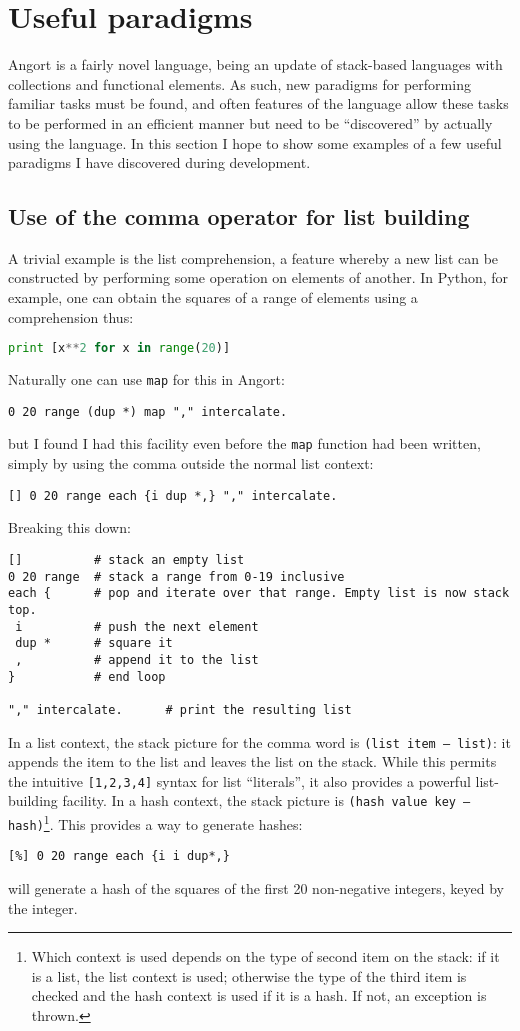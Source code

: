 \section{Useful paradigms}
Angort is a fairly novel language, being an update of stack-based
languages with collections and functional elements. As such, new
paradigms for performing familiar tasks must be found, and often
features of the language allow these tasks to be performed in
an efficient manner but need to be ``discovered''
by actually using the language. In this section I hope to show some
examples of a few useful paradigms I have discovered during development.


\subsection{Use of the comma operator for list building}
A trivial example
is the list comprehension, a feature whereby a new list can be constructed
by performing some operation on elements of another. In Python, for example,
one can obtain the squares of a range of elements using a comprehension thus:
\begin{lstlisting}[language=Python]
print [x**2 for x in range(20)]
\end{lstlisting}
Naturally one can use \texttt{map} for this in Angort:
\begin{lstlisting}
0 20 range (dup *) map "," intercalate.
\end{lstlisting}
but I found I had this facility even before the \texttt{map} function
had been written, simply by using
the comma outside the normal list context:
\begin{lstlisting}
[] 0 20 range each {i dup *,} "," intercalate.
\end{lstlisting}
Breaking this down:
\begin{lstlisting}
[]          # stack an empty list
0 20 range  # stack a range from 0-19 inclusive
each {      # pop and iterate over that range. Empty list is now stack top.
 i          # push the next element
 dup *      # square it
 ,          # append it to the list
}           # end loop

"," intercalate.      # print the resulting list
\end{lstlisting}
In a list context, the stack picture for the comma word is \texttt{(list item -- list)}:
it appends the item to the list and leaves the list on the stack. While this
permits the intuitive \texttt{[1,2,3,4]} syntax for list ``literals'', it
also provides a powerful list-building facility. In a hash context, the
stack picture is \texttt{(hash value key -- hash)}\footnote{Which context
is used depends on the type of second item on the stack: if it is a list,
the list context is used; otherwise the type of the third item is
checked and the hash context is used if it is a hash. If not, an exception
is thrown.}. This provides a way to generate hashes:
\begin{lstlisting}
[%] 0 20 range each {i i dup*,}
\end{lstlisting}
will generate a hash of the squares of the first 20 non-negative integers,
keyed by the integer.


